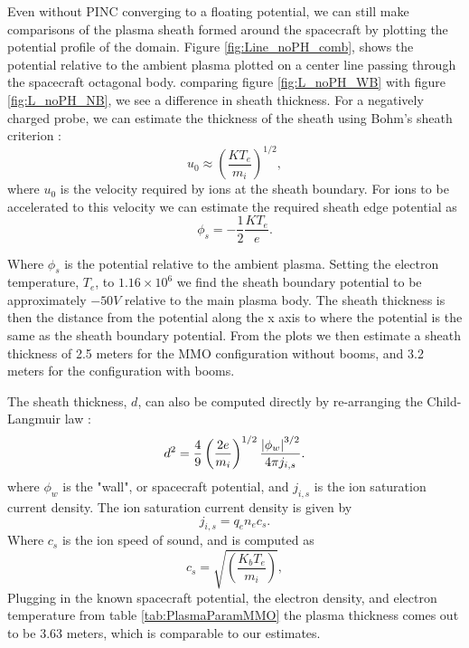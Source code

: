 Even without PINC converging to a floating potential, we can still make comparisons of the plasma sheath formed around the spacecraft by plotting the potential profile of the domain. Figure \ref{fig:Line_noPH_comb}, shows the potential relative to the ambient plasma plotted on a center line passing through the spacecraft octagonal body. comparing figure \ref{fig:L_noPH_WB} with figure \ref{fig:L_noPH_NB}, we see a difference in sheath thickness. For a negatively charged probe, we can estimate the thickness of the sheath using Bohm's sheath criterion \parencite{Chen2018}:
\begin{equation}\label{eq:BohmCrit}
    u_0 \approx \left(\frac{K T_e}{m_i}\right)^{1/2},
\end{equation}
where $u_0$ is the velocity required by ions at the sheath boundary. For ions to be accelerated to this velocity we can estimate the required sheath edge potential as
\begin{equation}\label{eq:PhiSheathEdge}
    \phi_s = -\frac{1}{2} \frac{K T_e}{e}.
\end{equation}

Where $\phi_s$ is the potential relative to the ambient plasma. Setting the electron temperature, $T_e$, to $1.16 \times 10^6$ we find the sheath boundary potential to be approximately $-50 V$ relative to the main plasma body. The sheath thickness is then the distance from the potential along the x axis to where the potential is the same as the sheath boundary potential. From the plots we then estimate a sheath thickness of 2.5 meters for the MMO configuration without booms, and 3.2 meters for the configuration with booms.

The sheath thickness, $d$, can also be computed directly by re-arranging the Child-Langmuir law \parencite{Chen2018}:
\begin{equation}\label{eq:childLangmuir}
    d^2 = \frac{4}{9} \left(\frac{2e}{m_i}\right)^{1/2} \frac{\abs{\phi_w}^{3/2}}{4 \pi j_{i,s}}.
\end{equation}
where $\phi_w$ is the "wall", or spacecraft potential, and $j_{i,s}$ is the ion saturation current density. The ion saturation current density is given by
\begin{equation}
    j_{i,s} = q_e n_e c_s.
\end{equation}
Where $c_s$ is the ion speed of sound, and is computed as \parencite{Paulsson2019}
\begin{equation}\label{eq:ionMach}
    c_s = \sqrt{\left(\frac{K_b T_e}{m_i}\right)},
\end{equation}
Plugging in the known spacecraft potential, the electron density, and electron temperature from table \ref{tab:PlasmaParamMMO}  the plasma thickness comes out to be 3.63 meters, which is comparable to our estimates. 

